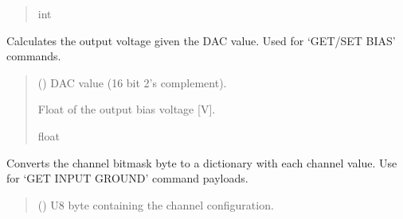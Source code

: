\documentclass[letterpaper,10pt,english]{sphinxmanual}
\begin{document}
\begin{fulllineitems}
\begin{fulllineitems}
\begin{quote}
\begin{description}
\sphinxAtStartPar
int

\end{description}\end{quote}

\end{fulllineitems}


\begin{fulllineitems}
\label{\detokenize{PodDevice_8401HR:PodDevice_8401HR.POD_8401HR.CalculateBiasDAC_GetVout}}
\pysigstartsignatures
{}
\pysigstopsignatures
\sphinxAtStartPar
Calculates the output voltage given the DAC value. Used for ‘GET/SET BIAS’ commands.
\begin{quote}\begin{description}
\sphinxAtStartPar
{} () \textendash{} DAC value (16 bit 2’s complement).

\sphinxAtStartPar
Float of the output bias voltage {[}V{]}.

\sphinxAtStartPar
float

\end{description}\end{quote}

\end{fulllineitems}


\begin{fulllineitems}
\label{\detokenize{PodDevice_8401HR:PodDevice_8401HR.POD_8401HR.DecodeChannelBitmask}}
\pysigstartsignatures
{}
\pysigstopsignatures
\sphinxAtStartPar
Converts the channel bitmask byte to a dictionary with each channel value.         Use for ‘GET INPUT GROUND’ command payloads.
\begin{quote}\begin{description}
\sphinxAtStartPar
{} () \textendash{} U8 byte containing the channel configuration.


\end{description}
\end{quote}
\end{fulllineitems}
\end{fulllineitems}
\end{document}
